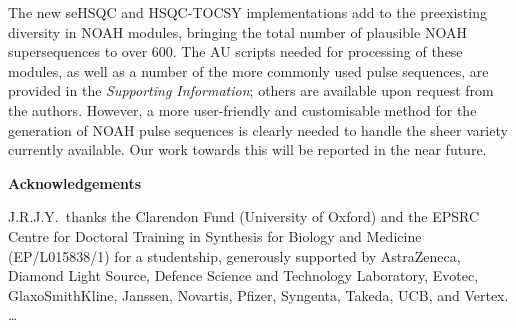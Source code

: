 \documentclass[11pt]{article}
\newcommand*{\hl}[1]{\textcolor{WildStrawberry}{#1}}
\newcommand*{\SInf}{\textit{Supporting Information}}
\begin{document}

The new seHSQC and HSQC-TOCSY implementations add to the preexisting diversity in NOAH modules, bringing the total number of plausible NOAH supersequences to over 600.
The AU scripts needed for processing of these modules, as well as a number of the more commonly used pulse sequences, are provided in the \SInf{}; others are available upon request from the authors.
However, a more user-friendly and customisable method for the generation of NOAH pulse sequences is clearly needed to handle the sheer variety currently available.
Our work towards this will be reported in the near future.



\textbf{\Large Acknowledgements}

J.R.J.Y.\ thanks the Clarendon Fund (University of Oxford) and the EPSRC Centre for Doctoral Training in Synthesis for Biology and Medicine (EP/L015838/1) for a studentship, generously supported by AstraZeneca, Diamond Light Source, Defence Science and Technology Laboratory, Evotec, GlaxoSmithKline, Janssen, Novartis, Pfizer, Syngenta, Takeda, UCB, and Vertex.
\hl{\ldots}

\printbibliography

\end{document}

